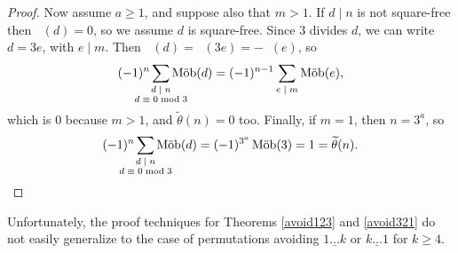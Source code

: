 \documentclass[12pt]{article}
\DeclareMathOperator{\mob}{M\ddot{o}b}
\theoremstyle{definition}
\begin{document}
\begin{proof}
Now assume $a \ge 1$, and suppose also that $m > 1$. If $d \mid n$ is not square-free then $\mob(d) = 0$, so we assume $d$ is square-free. Since $3$ divides $d$, we can write $d = 3e$, with $e \mid m$. Then $\mob(d) = \mob(3e) = -\mob(e)$, so
\[ (-1)^n \sum_{\mathclap{\substack{\text{$d \mid n$}\\ \text{$d \equiv 0\bmod 3$}}}} \mob(d) = (-1)^{n-1} \sum_{\text{$e \mid m$}} \mob(e), \]
which is $0$ because $m > 1$, and $\widetilde{\theta}(n) = 0$ too. Finally, if $m = 1$, then $n = 3^a$, so
\[ (-1)^n \sum_{\mathclap{\substack{\text{$d \mid n$}\\ \text{$d \equiv 0\bmod 3$}}}} \mob(d) = (-1)^{3^a} \mob(3) = 1 = \widetilde{\theta}(n). \qedhere \]
\end{proof}

Unfortunately, the proof techniques for Theorems \ref{avoid123} and \ref{avoid321} do not easily generalize to the case of permutations avoiding  $\underline{1\dots k}$ or $\underline{k\dots 1}$ for $k \ge 4$. 
\end{document}
